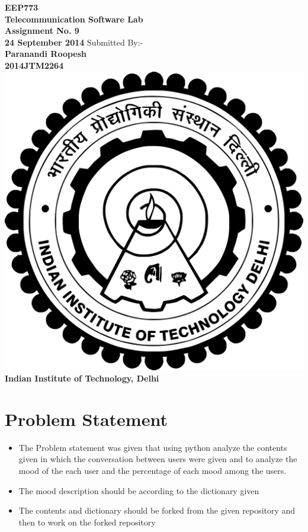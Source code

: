 \documentclass[a4paper,10pt]{article}
\begin{document}
\begin{titlepage}
\centering
\vfill
\textbf{\Huge{EEP773
\linebreak
\\Telecommunication\vskip0.18cm
Software Lab}
}\\
\vspace{2cm}
\textbf{\Large{Assignment No. 9}}\\
\textbf{\Large{24 September 2014}}
\vskip2cm
Submitted By:-
\Large{\textbf{\\Paranandi Roopesh
\\2014JTM2264}}
\vskip4cm
\includegraphics[scale=0.05]{iit_logo}\\
\textbf{
Indian Institute of Technology, Delhi
}
\vfill
\end{titlepage}

\tableofcontents
\pagebreak
\listoffigures
\pagebreak
\section{Problem Statement}
\begin{itemize}
 \item The Problem statement was given that using python analyze the contents given in which the conversation between users were given and to analyze the mood of the each user and the percentage of each mood among the users.
\item The mood description should be according to the dictionary given
\item The contents and dictionary should be forked from the given repository and then to work on the forked repository
\end{itemize}
\pagebreak
\end{document}
